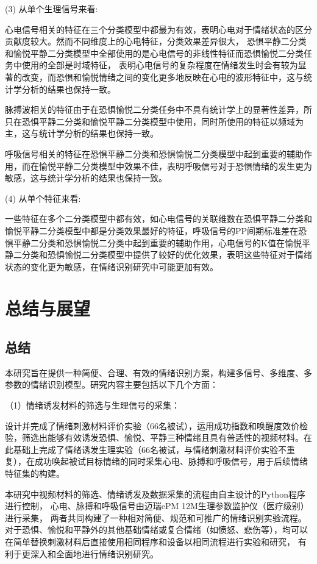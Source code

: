 (3) 从单个生理信号来看: 

心电信号相关的特征在三个分类模型中都最为有效，表明心电对于情绪状态的区分贡献度较大。然而不同维度上的心电特征，分类效果差异很大，
恐惧平静二分类和愉悦平静二分类模型中全部使用的是心电信号的非线性特征而恐惧愉悦二分类任务中使用的全部是时域特征，
表明心电信号的复杂程度在情绪发生时会有较为显著的改变，而恐惧和愉悦情绪之间的变化更多地反映在心电的波形特征中，这与统计学分析的结果也保持一致。

脉搏波相关的特征由于在恐惧愉悦二分类任务中不具有统计学上的显著性差异，所只在恐惧平静二分类和愉悦平静二分类模型中使用，同时所使用的特征以频域为主，这与统计学分析的结果也保持一致。 

呼吸信号相关的特征在恐惧平静二分类和恐惧愉悦二分类模型中起到重要的辅助作用，而在愉悦平静二分类模型中效果不佳，表明呼吸信号对于恐惧情绪的发生更为敏感，这与统计学分析的结果也保持一致。 

(4) 从单个特征来看: 

一些特征在多个二分类模型中都有效，如心电信号的关联维数在恐惧平静二分类和愉悦平静二分类模型中都是分类效果最好的特征，呼吸信号的PP间期标准差在恐惧平静二分类和恐惧愉悦二分类中起到重要的辅助作用，心电信号的K值在愉悦平静二分类和恐惧愉悦二分类模型中提供了较好的优化效果，表明这些特征对于情绪状态的变化更为敏感，在情绪识别研究中可能更加有效。




\clearpage
\section{总结与展望}

\subsection{总结}
本研究旨在提供一种简便、合理、有效的情绪识别方案，构建多信号、多维度、多参数的情绪识别模型。研究内容主要包括以下几个方面： 

（1）情绪诱发材料的筛选与生理信号的采集： 

设计并完成了情绪刺激材料评价实验（66名被试），运用成功指数和唤醒度效价检验，筛选出能够有效诱发恐惧、愉悦、平静三种情绪且具有普适性的视频材料。在此基础上完成了情绪诱发生理实验（66名被试，与情绪刺激材料评价实验不重复），在成功唤起被试目标情绪的同时采集心电、脉搏和呼吸信号，用于后续情绪特征集的构建。

本研究中视频材料的筛选、情绪诱发及数据采集的流程由自主设计的Python程序进行控制，
心电、脉搏和呼吸信号由迈瑞ePM 12M生理参数监护仪（医疗级别）进行采集，
两者共同构建了一种相对简便、规范和可推广的情绪识别实验流程。
对于恐惧、愉悦和平静外的其他基础情绪或复合情绪（如愤怒、悲伤等），均可以在简单替换刺激材料后直接使用相同程序和设备以相同流程进行实验和研究，
有利于更深入和全面地进行情绪识别研究。

